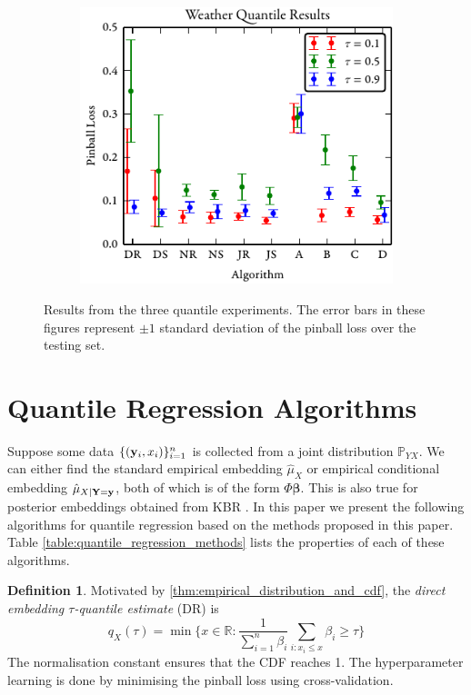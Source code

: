 \documentclass[twoside]{article} \usepackage{aistats2017}
\theoremstyle{definition}
\newtheorem{definition}{Definition}[section]
\theoremstyle{theorem}
\newcommand{\rv}[1]{{#1}}
\begin{document}
\begin{figure}[t]
\begin{subfigure}[b]{0.32\textwidth}
		\end{subfigure}
		\begin{subfigure}[b]{0.32\textwidth}
			\includegraphics[width=\textwidth]{figures/Weather_results}
		\end{subfigure}
		\caption{Results from the three quantile experiments. The error bars in these figures represent $\pm 1$ standard deviation of the pinball loss over the testing set.}
		\label{fig:qfull}
	\end{figure}

\section{Quantile Regression Algorithms}
\label{sec:quantile_regression_algorithms}
	
	Suppose some data $\{(\mathbf{y}_{i}, x_{i})\}_{i = 1}^{n}$ is collected from a joint distribution $\mathbb{P}_{\rv{Y} \rv{X}}$. We can either find the standard empirical embedding $\hat{\mu}_{\rv{X}}$ or empirical conditional embedding $\hat{\mu}_{\rv{X} | \bvec{\rv{Y}} = \bvec{y}}$, both of which is of the form $\Phi \bm{\beta}$. This is also true for posterior embeddings obtained from KBR \citep{fukumizu2013kernel}. In this paper we present the following algorithms for quantile regression based on the methods proposed in this paper. Table \ref{table:quantile_regression_methods} lists the properties of each of these algorithms.

	\theoremstyle{definition}
	\begin{definition}
		Motivated by \cref{thm:empirical_distribution_and_cdf}, the \textit{direct embedding $\tau$-quantile estimate} (DR) is
		\begin{equation}
		q_{\rv{X}}(\tau) = \min\{x \in \mathbb{R} : \frac{1}{\sum_{i = 1}^{n} \beta_{i}} \sum_{i : x_{i} \leq x} \beta_{i} \geq \tau\}
		\end{equation}	
		The normalisation constant ensures that the CDF reaches 1. The hyperparameter learning is done by minimising the pinball loss using cross-validation.
	\end{definition}
	
\end{document}

